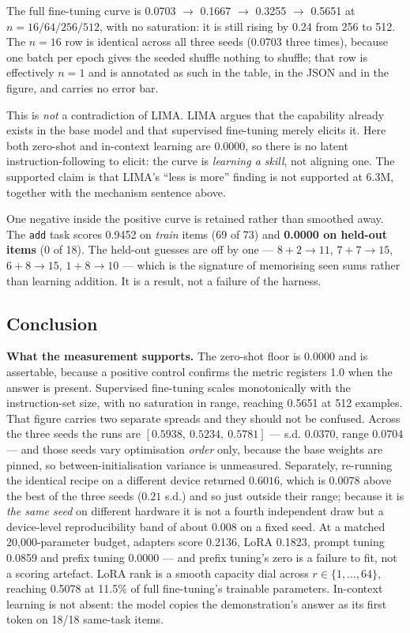 \documentclass[11pt,a4paper]{article}
\begin{document}
The full fine-tuning curve is 0.0703 $\to$ 0.1667 $\to$ 0.3255 $\to$ 0.5651 at
$n = 16/64/256/512$, with no saturation: it is still rising by 0.24 from 256
to 512. The $n = 16$ row is identical across all three seeds (0.0703 three
times), because one batch per epoch gives the seeded shuffle nothing to
shuffle; that row is effectively $n = 1$ and is annotated as such in the table,
in the JSON and in the figure, and carries no error bar. %


This is \emph{not} a contradiction of LIMA. LIMA argues that the capability
already exists in the base model and that supervised fine-tuning merely
elicits it. Here both zero-shot and in-context learning are 0.0000, so there
is no latent instruction-following to elicit: the curve is \emph{learning a
skill}, not aligning one. The supported claim is that LIMA's ``less is more''
finding is not supported at 6.3M, together with the mechanism sentence above. %


One negative inside the positive curve is retained rather than smoothed away.
The \texttt{add} task scores 0.9452 on \emph{train} items (69 of 73) and
\textbf{0.0000 on held-out items} (0 of 18). The held-out guesses are off by
one --- $8+2 \to 11$, $7+7 \to 15$, $6+8 \to 15$, $1+8 \to 10$ --- which is the
signature of memorising seen sums rather than learning addition. It is a
result, not a failure of the harness. %

\subsection{Conclusion}
\label{sec:act7-conclusion}

\textbf{What the measurement supports.} The zero-shot floor is 0.0000 and is
assertable, because a positive control confirms the metric registers 1.0 when
the answer is present. Supervised fine-tuning scales monotonically with the
instruction-set size, with no saturation in range, reaching 0.5651 at 512
examples. That figure carries two separate spreads and they should not be
confused. Across the three seeds the runs are
$[0.5938,\ 0.5234,\ 0.5781]$ --- s.d. $0.0370$, range $0.0704$ --- and
those seeds vary optimisation \emph{order} only, because the base weights are
pinned, so between-initialisation variance is unmeasured. Separately, re-running
the identical recipe on a different device returned $0.6016$, which is $0.0078$
above the best of the three seeds ($0.21$ s.d.) and so just outside their
range; because it is \emph{the same seed} on different hardware it is not a
fourth independent draw but a device-level reproducibility band of about
$0.008$ on a fixed seed. %
At a matched 20,000-parameter budget, adapters score 0.2136, LoRA
0.1823, prompt tuning 0.0859 and prefix tuning 0.0000 --- and prefix tuning's
zero is a failure to fit, not a scoring artefact. LoRA rank is a smooth
capacity dial across $r \in \{1,\dots,64\}$, reaching 0.5078 at 11.5\% of full
fine-tuning's trainable parameters. In-context learning is not absent: the
model copies the demonstration's answer as its first token on 18/18 same-task
items.
\end{document}
